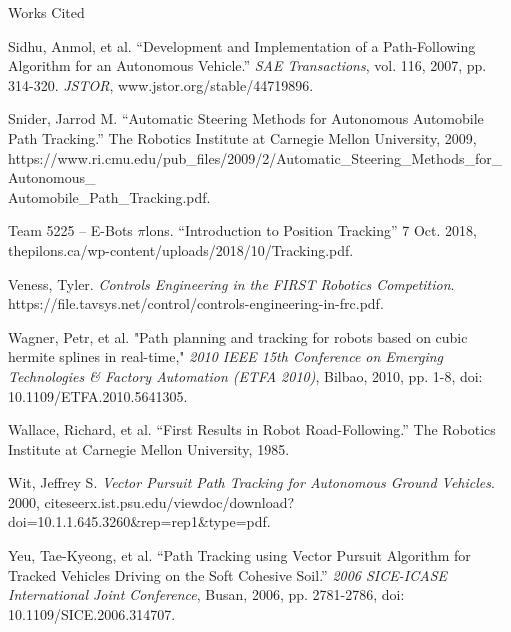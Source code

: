 \documentclass[12pt]{article}
\newcommand{\bibent}{\noindent \hangindent 40pt}
\newenvironment{workscited}{\newpage \begin{center} Works Cited \end{center}}{\newpage }
\begin{document}
\begin{flushleft}
\begin{workscited}
\bibent
Sidhu, Anmol, et al. “Development and Implementation of a Path-Following Algorithm for an Autonomous Vehicle.” \textit{SAE Transactions}, vol. 116, 2007, pp. 314-320. \textit{JSTOR}, www.jstor.org/stable/44719896.

\bibent
Snider, Jarrod M. “Automatic Steering Methods for Autonomous Automobile Path Tracking.” The Robotics Institute at Carnegie Mellon University, 2009, https://www.ri.cmu.edu/pub\_files/2009/2/Automatic\_Steering\_Methods\_for\_Autonomous\_\\Automobile\_Path\_Tracking.pdf.

\bibent
Team 5225 – E-Bots $\pi$lons. “Introduction to Position Tracking” 7 Oct. 2018, thepilons.ca/wp-content/uploads/2018/10/Tracking.pdf.

\bibent
Veness, Tyler. \textit{Controls Engineering in the FIRST Robotics Competition}. https://file.tavsys.net/control/controls-engineering-in-frc.pdf.

\bibent
Wagner, Petr, et al. "Path planning and tracking for robots based on cubic hermite splines in real-time," \textit{2010 IEEE 15th Conference on Emerging Technologies \& Factory Automation (ETFA 2010)}, Bilbao, 2010, pp. 1-8, doi: 10.1109/ETFA.2010.5641305.

\bibent
Wallace, Richard, et al. “First Results in Robot Road-Following.” The Robotics Institute at Carnegie Mellon University, 1985.

\bibent
Wit, Jeffrey S. \textit{Vector Pursuit Path Tracking for Autonomous Ground Vehicles}. 2000, citeseerx.ist.psu.edu/viewdoc/download?doi=10.1.1.645.3260\&rep=rep1\&type=pdf.

\bibent
Yeu, Tae-Kyeong, et al. “Path Tracking using Vector Pursuit Algorithm for Tracked Vehicles Driving on the Soft Cohesive Soil.” \textit{2006 SICE-ICASE International Joint Conference}, Busan, 2006, pp. 2781-2786, doi: 10.1109/SICE.2006.314707.

\end{workscited}

\end{flushleft}
\end{document}
